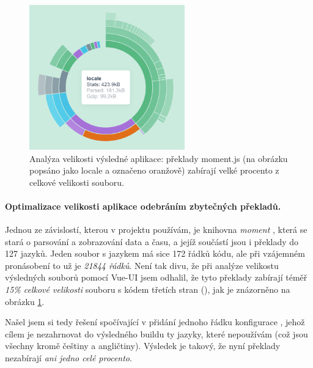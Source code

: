 \begin{figure}[h]
\includegraphics[width=0.6\textwidth]{../png/cli/analyze-moment.png}
\caption[Analýza velikosti výsledné aplikace: překlady moment.js]{Analýza velikosti výsledné aplikace: překlady moment.js (na obrázku popsáno jako locale a označeno oranžově) zabírají velké procento z celkové velikosti souboru.} \label{picture:cli:analyze}
\end{figure}

\paragraph{Optimalizace velikosti aplikace odebráním zbytečných překladů.} Jednou ze závislostí, kterou v projektu používám, je knihovna \emph{moment} \cite{momentjs}, která se stará o parsování a zobrazování data a času, a jejíž součástí jsou i překlady do 127 jazyků. Jeden soubor s jazykem má sice  172 řádků kódu, ale při vzájemném pronásobení to už je \emph{21844 řádků}. Není tak divu, že při analýze velikostu výsledných souborů pomocí Vue-UI jsem odhalil, že tyto překlady zabírají téměř \emph{15\% celkové velikosti} souboru s kódem třetích stran (), jak je znázorněno na obrázku \ref{picture:cli:analyze}.

Našel jsem si tedy řešení spočívající v přidání jednoho řádku konfigurace \cite{momentjs-ignore-locale}, jehož cílem je nezahrnovat do výsledného buildu ty jazyky, které nepoužívám (což jsou všechny kromě češtiny a angličtiny). Výsledek je takový, že nyní překlady nezabírají \emph{ani jedno celé procento}.


